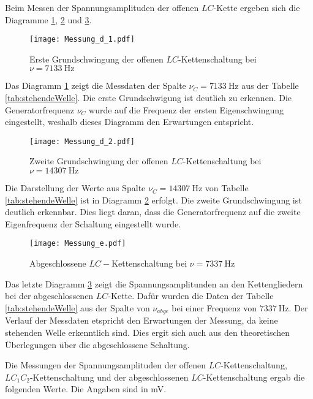 Beim Messen der Spannungsamplituden der offenen $LC$-Kette ergeben sich die Diagramme
\ref{fig:Messungd1}, \ref{fig:Messungd2} und \ref{fig:Messunge}.

\begin{figure}
  \texttt{[image: Messung\_d\_1.pdf]}
  \caption{Erste Grundschwingung der offenen $LC$-Kettenschaltung bei $\nu = \SI{7133}{\hertz}$}
  \label{fig:Messungd1}
\end{figure}

Das Diagramm \ref{fig:Messungd1} zeigt die Messdaten der Spalte $\nu_C=\SI{7133}{\hertz}$
aus der Tabelle \ref{tab:stehendeWelle}. Die erste Grundschwigung ist deutlich
zu erkennen. Die Generatorfrequenz $\nu_C$ wurde auf die Frequenz
der ersten Eigenschwingung eingestellt, weshalb dieses Diagramm den Erwartungen
entspricht.

\FloatBarrier
\begin{figure}
  \texttt{[image: Messung\_d\_2.pdf]}
  \caption{Zweite Grundschwingung der offenen $LC$-Kettenschaltung bei $\nu = \SI{14307}{\hertz}$}
  \label{fig:Messungd2}
\end{figure}

Die Darstellung der Werte aus Spalte $\nu_{C} = \SI{14307}{\hertz}$ von Tabelle \ref{tab:stehendeWelle}
ist in Diagramm \ref{fig:Messungd2} erfolgt. Die zweite Grundschwingung ist deutlich
erkennbar. Dies liegt daran, dass die Generatorfrequenz auf die zweite
Eigenfrequenz der Schaltung eingestellt wurde.

\FloatBarrier
\begin{figure}
  \texttt{[image: Messung\_e.pdf]}
  \caption{Abgeschlossene $LC-$Kettenschaltung bei $\nu = \SI{7337}{\hertz}$}
  \label{fig:Messunge}
\end{figure}

Das letzte Diagramm \ref{fig:Messunge} zeigt die Spannungsamplitunden
an den Kettengliedern bei der abgeschlossenen $LC$-Kette. Dafür wurden die
Daten der Tabelle \ref{tab:stehendeWelle} aus der Spalte von $\nu_{abge}$
bei einer Frequenz von $\SI{7337}{\hertz}$. Der Verlauf der Messdaten etspricht
den Erwartungen der Messung, da keine stehenden Welle erkenntlich sind.
Dies ergit sich auch aus den theoretischen Überlegungen über die
abgeschlossene Schaltung.

Die Messungen der Spannungsamplituden der offenen $LC$-Kettenschaltung, $LC_1C_2$-Kettenschaltung
und der abgeschlossenen $LC$-Kettenschaltung ergab die folgenden Werte. Die Angaben sind
in \si{\milli\volt}.

